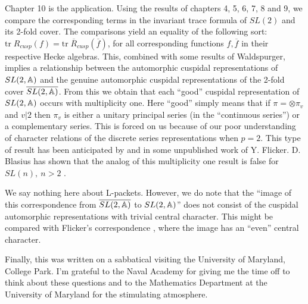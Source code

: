 \documentclass[12pt,thmsa]{book}
\begin{document}
Chapter 10 is the application. Using the results of chapters 4, 5, 6, 7, 8
and 9, we compare the corresponding terms in the invariant
trace formula of $SL(2)$ and its 2-fold cover. The comparisons
yield an equality of the
following sort:
$\mathrm{tr}\;R_{cusp}(f)=\mathrm{tr}\;\overline{R}_{cusp}(\overline{f})$,
for all corresponding functions $f,\overline{f}$ in their
respective Hecke algebras. This, combined with some results of Waldspurger,
implies a relationship between the automorphic cuspidal
representations of $SL(2,\Bbb{A})$ and the genuine automorphic
cuspidal representations of the
2-fold cover $\overline{SL(2,\Bbb{A})}$. From this we obtain that each
``good'' cuspidal representation of $SL(2,{\Bbb{A}})$ occurs with
multiplicity one. Here ``good'' simply means that if $\pi =\otimes \pi _v$
and $v|2$ then $\pi _v$ is either a unitary principal series (in the
``continuous series'') or a complementary series. This is forced on us
because of our poor understanding of character relations of the discrete
series representations when $p=2$. This type of result has been anticipated
by \cite{Lab} and in some unpublished work of Y. Flicker. D. Blasius has
shown that the analog of this multiplicity one result is false for $SL(n),\
n>2$ \cite{Blas}.

We say nothing here about L-packets. However, we do note that the ``image of
this correspondence from $\overline{SL(2,\Bbb{A})}$ to $SL(2,\Bbb{A})$''
does not consist of the cuspidal automorphic representations with trivial
central character. This might be compared with Flicker's correspondence \cite
{Fl}, where the image has an ``even'' central character.

Finally, this was written on a sabbatical visiting the University of
Maryland, College Park. I'm grateful to the Naval Academy for giving me the
time off to think about these questions and
to the Mathematics Department at the
University of Maryland for the stimulating atmosphere.

    
    
    
    
    
  
\end{document}
